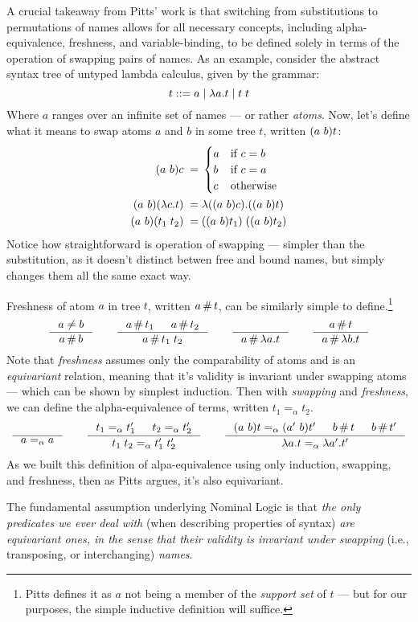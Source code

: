 \documentclass[english, mgr]{iithesis}
\renewcommand{\it}[1]{\textit{#1}}
\begin{document}
A crucial takeaway from Pitts' work is that switching from substitutions to permutations of names
allows for all necessary concepts, including alpha-equivalence, freshness, and variable-binding,
to be defined solely in terms of the operation of swapping pairs of names.
As an example, consider the abstract syntax tree of untyped lambda calculus,
given by the grammar:
$$
 t ::= a \mid \lambda a . t \mid t\;t
$$
Where $a$ ranges over an infinite set of names --- or rather \it{atoms}.
Now, let's define what it means to swap atoms $a$ and $b$ in some tree $t$,
written $(a\ b) t$:
\begin{align*}
(a\ b) c \;=&\;
\begin{cases}
    a & \text{if } c = b \\
    b & \text{if } c = a \\
    c & \text{otherwise}
\end{cases} \\
(a\ b) (\lambda c . t) \;=&\; \lambda ((a\ b) c) . ((a\ b) t) \\
(a\ b) (t_1\; t_2) \;=&\; ((a\ b) t_1) \; ((a\ b) t_2) \\
\end{align*}
\newcommand{\aequiv}{\ensuremath{=_\alpha}}
Notice how straightforward is operation of swapping --- simpler than the substitution,
as it doesn't distinct betwen free and bound names, but simply changes them all the same exact way.

Freshness of atom $a$ in tree $t$, written $a \,\#\, t$, can be similarly
simple to define.\footnote{Pitts defines it as
$a$ not being a member of the \it{support set} of $t$ ---
but for our purposes, the simple inductive definition will suffice.}
$$
\inference{
  a \cneq b
}{
  a \cfresh b
}
\qquad
\inference{
  a \cfresh t_1
  &
  a \cfresh t_2
}{
  a \cfresh t_1\;t_2
}
\qquad
\inference{
 \;
}{
  a \cfresh \lambda a . t
}
\qquad
\inference{
  a \cfresh t
}{
  a \cfresh \lambda b . t
}
$$
Note that \it{freshness} assumes only the comparability of atoms
and is an \it{equivariant} relation, meaning that
it's validity is invariant under swapping atoms
--- which can be shown by simplest induction.
Then with \it{swapping} and \it{freshness},
we can define the alpha-equivalence of terms, written $t_1 \aequiv t_2$.
$$
\inference{
  \text{}
}{
  a \aequiv a
}
\qquad
\inference{
  t_1 \aequiv t_1'
  &
  t_2 \aequiv t_2'
}{
  t_1\;t_2 \aequiv t_1'\;t_2'
}
\qquad
\inference{
  \permswap{a}{b}{t} \aequiv \permswap{a'}{b}{t'}
  &
  b \cfresh t
  &
  b \cfresh t'
}{
  \lambda a . t \aequiv \lambda a' . t'
}
$$
As we built this definition of alpa-equivalence using only induction,
swapping, and freshness, then as Pitts argues, it's also equivariant.
\begin{mdframed}[frametitle={Pitts, 2003}]
The fundamental assumption underlying Nominal Logic is that \textit{the only predicates we ever deal with} (when describing properties of syntax) \textit{are equivariant ones, in the sense that their validity is invariant under swapping} (i.e., transposing, or interchanging) \textit{names}.
\end{mdframed}
\end{document}
